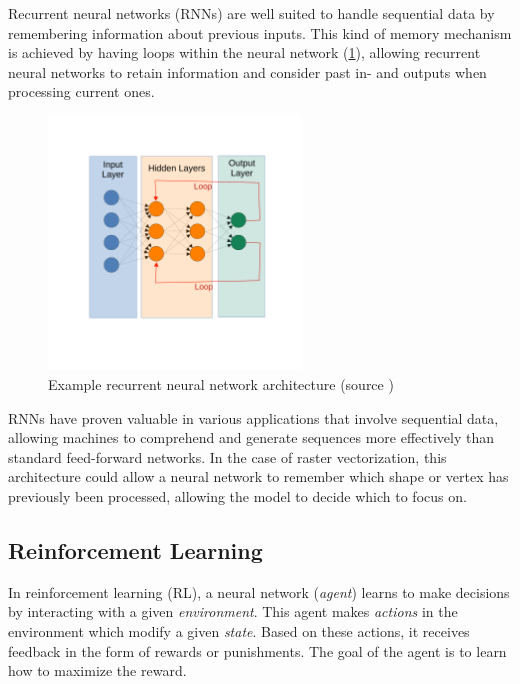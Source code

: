 \documentclass[12pt, a4paper, titlepage]{report}
\begin{document}
Recurrent neural networks (RNNs) are well suited to handle sequential data by remembering information about previous inputs. This kind of memory mechanism is achieved by having loops within the neural network (\ref{fig:rnn_architecture}), allowing recurrent neural networks to retain information and consider past in- and outputs when processing current ones. 

\begin{figure}[H]
   \centering
	\includegraphics[width=0.6\textwidth]{../rc/images/rnn_architecture.pdf}
   \caption{Example recurrent neural network architecture (source \cite{img_rnn_architecture})}
	\label{fig:rnn_architecture}
\end{figure}

RNNs have proven valuable in various applications that involve sequential data, allowing machines to comprehend and generate sequences more effectively than standard feed-forward networks. In the case of raster vectorization, this architecture could allow a neural network to remember which shape or vertex has previously been processed, allowing the model to decide which to focus on.

\subsection{Reinforcement Learning}

In reinforcement learning (RL), a neural network (\emph{agent}) learns to make decisions by interacting with a given \emph{environment}. This agent makes \emph{actions} in the environment which modify a given \emph{state}. Based on these actions, it receives feedback in the form of rewards or punishments. The goal of the agent is to learn how to maximize the reward.
\end{document}
